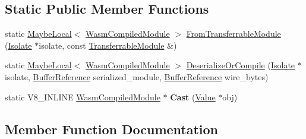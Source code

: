 \subsection*{Static Public Member Functions}
\begin{DoxyCompactItemize}
\item 
static \mbox{\hyperlink{classv8_1_1MaybeLocal}{Maybe\+Local}}$<$ \mbox{\hyperlink{classv8_1_1WasmCompiledModule}{Wasm\+Compiled\+Module}} $>$ \mbox{\hyperlink{classv8_1_1WasmCompiledModule_a6bdfdf09e75ad1eb19d5b944e6177f74}{From\+Transferrable\+Module}} (\mbox{\hyperlink{classv8_1_1Isolate}{Isolate}} $\ast$isolate, const \mbox{\hyperlink{classv8_1_1WasmCompiledModule_1_1TransferrableModule}{Transferrable\+Module}} \&)
\item 
static \mbox{\hyperlink{classv8_1_1MaybeLocal}{Maybe\+Local}}$<$ \mbox{\hyperlink{classv8_1_1WasmCompiledModule}{Wasm\+Compiled\+Module}} $>$ \mbox{\hyperlink{classv8_1_1WasmCompiledModule_abd5b90ef1d021e148c2fcb052a8651d4}{Deserialize\+Or\+Compile}} (\mbox{\hyperlink{classv8_1_1Isolate}{Isolate}} $\ast$isolate, \mbox{\hyperlink{structv8_1_1WasmCompiledModule_1_1BufferReference}{Buffer\+Reference}} serialized\+\_\+module, \mbox{\hyperlink{structv8_1_1WasmCompiledModule_1_1BufferReference}{Buffer\+Reference}} wire\+\_\+bytes)
\item 
\mbox{\label{classv8_1_1WasmCompiledModule_a6dace1927ba208e592a4dc67ccc8149c}} 
static V8\+\_\+\+I\+N\+L\+I\+NE \mbox{\hyperlink{classv8_1_1WasmCompiledModule}{Wasm\+Compiled\+Module}} $\ast$ {\bfseries Cast} (\mbox{\hyperlink{classv8_1_1Value}{Value}} $\ast$obj)
\end{DoxyCompactItemize}


\subsection{Member Function Documentation}
\mbox{\label{classv8_1_1WasmCompiledModule_abd5b90ef1d021e148c2fcb052a8651d4}} 
